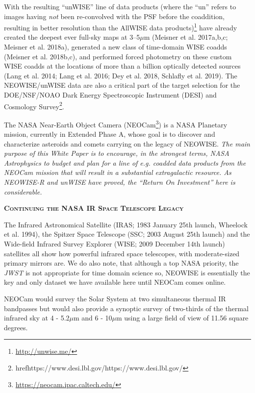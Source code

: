 \documentclass[12pt]{article}
\begin{document}
\smallskip 
\smallskip
\noindent
With the resulting ``unWISE'' line of data products (where the ``un''
refers to images having {\it not} been re-convolved with the PSF
before the coaddition, resulting in better resolution than the AllWISE
data products)\footnote{\href{http://unwise.me/}{http://unwise.me/}}
have already created the deepest ever full-sky maps at 3–5$\mu$m
(Meisner et al. 2017a,b,c; Meisner et al. 2018a), generated a new
class of time-domain WISE coadds (Meisner et al.  2018b,c), and
performed forced photometry on these custom WISE coadds at the
locations of more than a billion optically detected sources (Lang et
al. 2014; Lang et al. 2016; Dey et al. 2018, Schlafly et
al. 2019). The NEOWISE/unWISE data are also a critical part of the
target selection for the DOE/NSF/NOAO Dark Energy Spectroscopic
Instrument (DESI) and Cosmology
Survey\footnote{href{https://www.desi.lbl.gov/}{https://www.desi.lbl.gov/}}.

\smallskip
\smallskip 
\noindent
The NASA Near-Earth Object Camera
(NEOCam\footnote{\href{https://neocam.ipac.caltech.edu/}{https://neocam.ipac.caltech.edu/}})
is a NASA Planetary mission, currently in Extended Phase A, whose goal is to
discover and characterize asteroids and comets carrying on the legacy
of NEOWISE. {\it The main purpose of this White Paper is to encourage,
in the strongest terms, NASA Astrophysics to budget and plan for a
line of e.g. coadded data products from the NEOCam mission that will
result in a substantial extragalactic resource. As NEOWISE-R and
unWISE have proved, the ``Return On Investment'' here is
considerable.}


\smallskip
\smallskip
\noindent
{\bfseries \textsc{\textcolor{Cerulean}{Continuing the NASA IR Space Telescope Legacy}}} 

\smallskip
\noindent
The Infrared Astronomical Satellite (IRAS; 1983 January 25th launch, Wheelock et al. 1994), the Spitzer Space Telescope (SSC; 2003 August 25th launch) and the Wide-field Infrared Survey Explorer (WISE; 2009 December 14th launch) satellites all show how powerful infrared space telescopes, with moderate-sized primary mirrors are. We do also note, that although a top NASA priority, the {\it JWST} is not appropriate for time domain science so, NEOWISE is essentially the key and only dataset we have available here until NEOCam comes online. 

\smallskip
\smallskip
\noindent
NEOCam would survey the Solar System at two simultaneous thermal IR
bandpasses but would also provide a synoptic survey of two-thirds of
the thermal infrared sky at 4 - 5.2$\mu$m and 6 - 10$\mu$m using a
large field of view of 11.56 square degrees.
\end{document}
